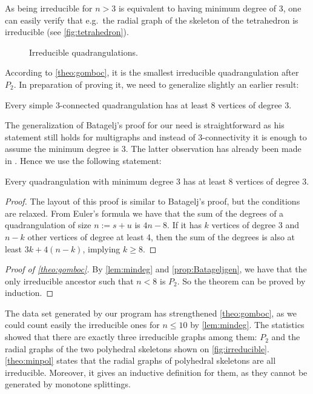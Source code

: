 \documentclass[]{article}
\begin{document}
As being irreducible for $n>3$ is equivalent to having minimum degree of 3, one can easily verify that e.g.\  the radial graph of the skeleton of the tetrahedron is irreducible (see \autoref{fig:tetrahedron}).
\begin{figure}\centering
\qquad\qquad\qquad {}
\caption{Irreducible quadrangulations.}
\label{fig:irreducible}
\end{figure}
According to \autoref{theo:gomboc}, it is the smallest irreducible quadrangulation after $P_2$.
In preparation of proving it, we need to generalize slightly an earlier result:
\begin{prop}
  \label{prop:Batagelj}
  Every simple 3-connected quadrangulation has at least 8 vertices of degree 3.
\end{prop}

The generalization of Batagelj's proof for our need is straightforward as his statement still holds for multigraphs and instead of 3-connectivity it is enough to assume the minimum degree is 3.
The latter observation has already been made in \cite{Brinkmann2005}.
Hence we use the following statement:

\begin{prop}\label{prop:Batageljgen}
  Every quadrangulation with minimum degree 3 has at least 8 vertices of degree 3.
\end{prop}

\begin{proof}The layout of this proof is similar to Batagelj's proof, but the conditions are relaxed.
From Euler's formula we have that the sum of the degrees of a quadrangulation of size $n:=s+u$ is $4n-8$.
If it has $k$ vertices of degree 3 and $n-k$ other vertices of degree at least 4, then the sum of the degrees is also at least $3k+4(n-k)$, implying $k\geq 8$.
\end{proof}

\begin{proof}[Proof of \autoref*{theo:gomboc}]
  By \autoref{lem:mindeg} and \autoref{prop:Batageljgen}, we have that the only irreducible ancestor such that $n<8$ is $P_2$.
So the theorem can be proved by induction.
\end{proof}

The data set generated by our program has strengthened \autoref{theo:gomboc}, as we could count easily the irreducible ones for $n\leq 10$ by \autoref{lem:mindeg}.
The statistics showed that there are exactly three irreducible graphs among them: $P_2$ and the radial graphs of the two polyhedral skeletons shown on \autoref{fig:irreducible}.
\autoref{theo:minpol} states that the radial graphs of polyhedral skeletons are all irreducible.
Moreover, it gives an inductive definition for them, as they cannot be generated by monotone splittings.
\end{document}
